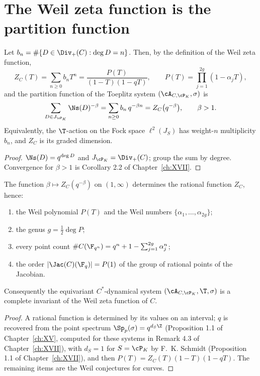 \section{The Weil zeta function is the partition function}

\begin{theorem}\label{XVIII:thm:partition}
Let $b_n=\#\{D\in\Div_+(C):\deg D=n\}$. Then, by the definition of the Weil zeta function,
\[
Z_C(T)=\sum_{n\ge0}b_nT^n=\frac{P(T)}{(1-T)(1-qT)},\qquad P(T)=\prod_{j=1}^{2g}(1-\alpha_jT),
\]
and the partition function of the Toeplitz system $(\cA_{C,\cP_K},\sigma)$ is
\begin{equation}\label{XVIII:eq:partition}
\sum_{D\in J_{\cP_K}}\Ns(D)^{-\beta}=\sum_{n\ge0}b_n\,q^{-\beta n}=Z_C\bigl(q^{-\beta}\bigr),
\qquad\beta>1 .
\end{equation}
Equivalently, the $\T$-action on the Fock space $\ell^2(J_S)$ has weight-$n$ multiplicity
$b_n$, and $Z_C$ is its graded dimension.
\end{theorem}

\begin{proof}
$\Ns(D)=q^{\deg D}$ and $J_{\cP_K}=\Div_+(C)$; group the sum by degree. Convergence for
$\beta>1$ is Corollary 2.2 of Chapter~\ref{ch:XVII}.
\end{proof}

\begin{theorem}\label{XVIII:thm:reconstruct}
The function $\beta\mapsto Z_C(q^{-\beta})$ on $(1,\infty)$ determines the rational function
$Z_C$, hence:
\begin{enumerate}
\item the Weil polynomial $P(T)$ and the Weil numbers $\{\alpha_1,\dots,\alpha_{2g}\}$;
\item the genus $g=\tfrac12\deg P$;
\item every point count $\#C(\F_{q^n})=q^n+1-\sum_{j=1}^{2g}\alpha_j^n$;
\item the order $|\Jac(C)(\F_q)|=P(1)$ of the group of rational points of the Jacobian.
\end{enumerate}
Consequently the equivariant $C^*$-dynamical system $(\cA_{C,\cP_K},\T,\sigma)$ is a complete
invariant of the Weil zeta function of $C$.
\end{theorem}

\begin{proof}
A rational function is determined by its values on an interval; $q$ is recovered from the
point spectrum $\Sp_p(\sigma)=q^{d_S\Z}$ (Proposition 1.1 of Chapter~\ref{ch:XV}, computed for these
systems in Remark 4.3 of Chapter~\ref{ch:XVII}), with $d_S=1$ for $S=\cP_K$ by F.~K. Schmidt
(Proposition 1.1 of Chapter~\ref{ch:XVII}), and then
$P(T)=Z_C(T)(1-T)(1-qT)$. The remaining items are the Weil conjectures for curves.
\end{proof}

